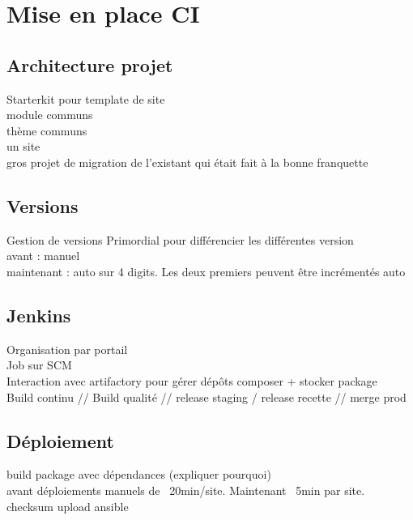 \section{Mise en place CI}
\subsection[Architecture]{Architecture projet}
\begin{frame}{\subsecname}
	Starterkit pour template de site
	 \\
	 module communs
	 \\
	 thème communs
	 \\
	 un site 
	 \\ gros projet de migration de l'existant qui était fait à la bonne franquette
\end{frame}

\subsection{Versions}
\begin{frame}{Gestion de versions}
	Primordial pour différencier les différentes version \\
	avant : manuel \\
	maintenant : auto sur 4 digits. Les deux premiers peuvent être incrémentés auto
\end{frame}

\subsection{Jenkins}
\begin{frame}{\subsecname}
	Organisation par portail \\ 
	Job sur SCM \\
	Interaction avec artifactory pour gérer dépôts composer + stocker package \\
	Build continu // Build qualité // release staging / release recette // merge prod
\end{frame}

\subsection{Déploiement}
\begin{frame}{\subsecname}
	build package avec dépendances (expliquer pourquoi)\\
	avant déploiements manuels de ~20min/site. Maintenant ~5min par site. \\
	checksum
	upload
	ansible
\end{frame}

